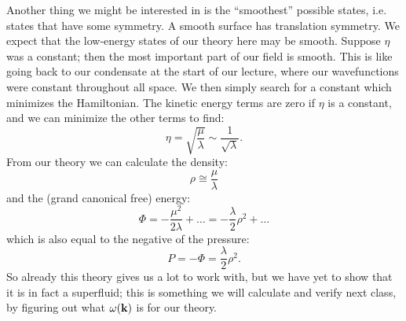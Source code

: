 Another thing we might be interested in is the ``smoothest'' possible states, i.e. states that have some symmetry. A smooth surface has translation symmetry. We expect that the low-energy states of our theory here may be smooth. Suppose $\eta$ was a constant; then the most important part of our field is smooth. This is like going back to our condensate at the start of our lecture, where our wavefunctions were constant throughout all space. We then simply search for a constant which minimizes the Hamiltonian. The kinetic energy terms are zero if $\eta$ is a constant, and we can minimize the other terms to find:
\begin{equation}
    \eta = \sqrt{\frac{\mu}{\lambda}} \sim \frac{1}{\sqrt{\lambda}}.
\end{equation}
From our theory we can calculate the density:
\begin{equation}
    \rho \cong \frac{\mu}{\lambda}
\end{equation}
and the (grand canonical free) energy:
\begin{equation}
    \Phi = -\frac{\mu^2}{2\lambda} + \ldots = -\frac{\lambda}{2} \rho^2 + \ldots
\end{equation}
which is also equal to the negative of the pressure:
\begin{equation}
    P = -\Phi = \frac{\lambda}{2}\rho^2.
\end{equation}
So already this theory gives us a lot to work with, but we have yet to show that it is in fact a superfluid; this is something we will calculate and verify next class, by figuring out what $\omega(\mathbf{k})$ is for our theory. 